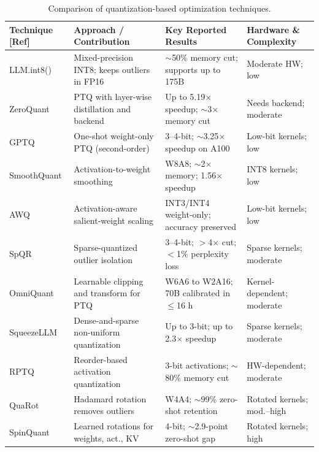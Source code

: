 \documentclass[
11pt, %
english, %
singlespacing, %
headsepline, %
]{MastersDoctoralThesis} %
\begin{document}
\begin{table}[htbp]
\centering
\scriptsize
\caption{Comparison of quantization-based optimization techniques.}
\label{tab:lr-quant}
\renewcommand{\arraystretch}{1.2}
\begin{tabular}{p{}p{}p{}p{}}
\hline
\textbf{Technique [Ref]} & \textbf{Approach / Contribution} & \textbf{Key Reported Results} & \textbf{Hardware \& Complexity} \\
\hline
LLM.int8() \cite{dettmers2022llmint8} & Mixed-precision INT8; keeps outliers in FP16 & $\sim$50\% memory cut; supports up to 175B & Moderate HW; low \\
ZeroQuant \cite{yao2022zeroquant} & PTQ with layer-wise distillation and backend & Up to 5.19$\times$ speedup; $\sim$3$\times$ memory cut & Needs backend; moderate \\
GPTQ \cite{frantar2023gptq} & One-shot weight-only PTQ (second-order) & 3--4-bit; $\sim$3.25$\times$ speedup on A100 & Low-bit kernels; low \\
SmoothQuant \cite{xiao2023smoothquant} & Activation-to-weight smoothing & W8A8; $\sim$2$\times$ memory; 1.56$\times$ speedup & INT8 kernels; low \\
AWQ \cite{lin2024awq} & Activation-aware salient-weight scaling & INT3/INT4 weight-only; accuracy preserved & Low-bit kernels; low \\
SpQR \cite{dettmers2024spqr} & Sparse-quantized outlier isolation & 3--4-bit; $>$4$\times$ cut; $<$1\% perplexity loss & Sparse kernels; moderate \\
OmniQuant \cite{shao2024omniquant} & Learnable clipping and transform for PTQ & W6A6 to W2A16; 70B calibrated in $\leq$16 h & Kernel-dependent; moderate \\
SqueezeLLM \cite{kim2024squeezellm} & Dense-and-sparse non-uniform quantization & Up to 3-bit; up to 2.3$\times$ speedup & Sparse kernels; moderate \\
RPTQ \cite{yuan2023rptq} & Reorder-based activation quantization & 3-bit activations; $\sim$80\% memory cut & HW-dependent; moderate \\
QuaRot \cite{ashkboos2024quarot} & Hadamard rotation removes outliers & W4A4; $\sim$99\% zero-shot retention & Rotated kernels; mod.--high \\
SpinQuant \cite{liu2025spinquant} & Learned rotations for weights, act., KV & 4-bit; $\sim$2.9-point zero-shot gap & Rotated kernels; high \\

\end{tabular}
\end{table}
\end{document}
